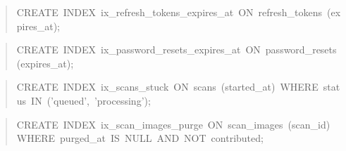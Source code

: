 \begin{quote}\scriptsize\ttfamily\raggedright
CREATE\ INDEX\ ix\_\allowbreak{}refresh\_\allowbreak{}tokens\_\allowbreak{}expires\_\allowbreak{}at\ ON\ refresh\_\allowbreak{}tokens\ (expires\_\allowbreak{}at);
\end{quote}
\begin{quote}\scriptsize\ttfamily\raggedright
CREATE\ INDEX\ ix\_\allowbreak{}password\_\allowbreak{}resets\_\allowbreak{}expires\_\allowbreak{}at\ ON\ password\_\allowbreak{}resets\ (expires\_\allowbreak{}at);
\end{quote}
\begin{quote}\scriptsize\ttfamily\raggedright
CREATE\ INDEX\ ix\_\allowbreak{}scans\_\allowbreak{}stuck\ ON\ scans\ (started\_\allowbreak{}at)\ WHERE\ status\ IN\ ('queued',\ 'processing');
\end{quote}
\begin{quote}\scriptsize\ttfamily\raggedright
CREATE\ INDEX\ ix\_\allowbreak{}scan\_\allowbreak{}images\_\allowbreak{}purge\ ON\ scan\_\allowbreak{}images\ (scan\_\allowbreak{}id)\ WHERE\ purged\_\allowbreak{}at\ IS\ NULL\ AND\ NOT\ contributed;
\end{quote}
